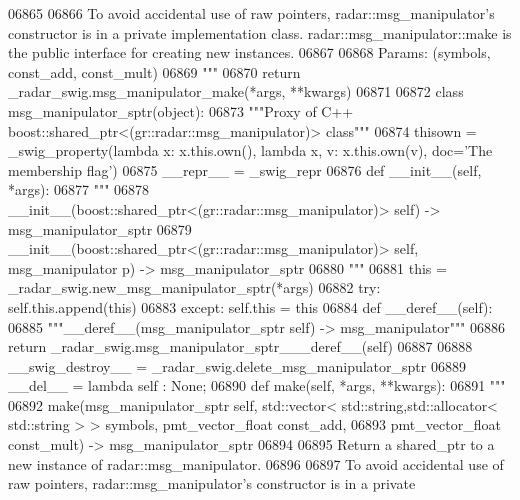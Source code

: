 \begin{DoxyCode}
{{{{{{{{{{{{{{{{{{{{{{{06865 \textcolor{stringliteral}{}
06866 \textcolor{stringliteral}{    To avoid accidental use of raw pointers, radar::msg\_manipulator's constructor is in a private
       implementation class. radar::msg\_manipulator::make is the public interface for creating new instances.}
06867 \textcolor{stringliteral}{}
06868 \textcolor{stringliteral}{    Params: (symbols, const\_add, const\_mult)}
06869 \textcolor{stringliteral}{    """}
06870   \textcolor{keywordflow}{return} \_radar\_swig.msg\_manipulator\_make(*args, **kwargs)
06871 
06872 \textcolor{keyword}{class }msg_manipulator_sptr(object):
06873     \textcolor{stringliteral}{"""Proxy of C++ boost::shared\_ptr<(gr::radar::msg\_manipulator)> class"""}
06874     thisown = _swig_property(\textcolor{keyword}{lambda} x: x.this.own(), \textcolor{keyword}{lambda} x, v: x.this.own(v), doc=\textcolor{stringliteral}{'The membership flag'})
06875     \_\_repr\_\_ = \_swig\_repr
06876     \textcolor{keyword}{def }__init__(self, *args): 
06877         \textcolor{stringliteral}{"""}
06878 \textcolor{stringliteral}{        \_\_init\_\_(boost::shared\_ptr<(gr::radar::msg\_manipulator)> self) -> msg\_manipulator\_sptr}
06879 \textcolor{stringliteral}{        \_\_init\_\_(boost::shared\_ptr<(gr::radar::msg\_manipulator)> self, msg\_manipulator p) ->
       msg\_manipulator\_sptr}
06880 \textcolor{stringliteral}{        """}
06881         this = \_radar\_swig.new\_msg\_manipulator\_sptr(*args)
06882         \textcolor{keywordflow}{try}: self.this.append(this)
06883         \textcolor{keywordflow}{except}: self.this = this
06884     \textcolor{keyword}{def }__deref__(self):
06885         \textcolor{stringliteral}{"""\_\_deref\_\_(msg\_manipulator\_sptr self) -> msg\_manipulator"""}
06886         \textcolor{keywordflow}{return} \_radar\_swig.msg\_manipulator\_sptr\_\_\_deref\_\_(self)
06887 
06888     \_\_swig\_destroy\_\_ = \_radar\_swig.delete\_msg\_manipulator\_sptr
06889     \_\_del\_\_ = \textcolor{keyword}{lambda} self : \textcolor{keywordtype}{None};
06890     \textcolor{keyword}{def }make(self, *args, **kwargs):
06891         \textcolor{stringliteral}{"""}
06892 \textcolor{stringliteral}{        make(msg\_manipulator\_sptr self, std::vector< std::string,std::allocator< std::string > > symbols,
       pmt\_vector\_float const\_add, }
06893 \textcolor{stringliteral}{            pmt\_vector\_float const\_mult) -> msg\_manipulator\_sptr}
06894 \textcolor{stringliteral}{}
06895 \textcolor{stringliteral}{        Return a shared\_ptr to a new instance of radar::msg\_manipulator.}
06896 \textcolor{stringliteral}{}
06897 \textcolor{stringliteral}{        To avoid accidental use of raw pointers, radar::msg\_manipulator's constructor is in a private
}}}}}}}}}}}}}}}}}}}}}}}}
\end{DoxyCode}
